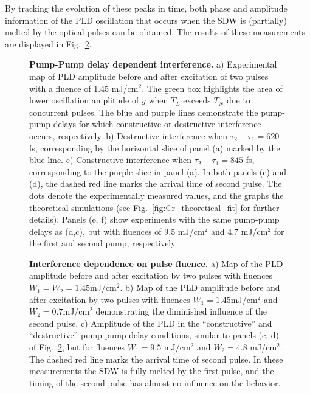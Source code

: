 By tracking the evolution of these peaks in time, both phase and amplitude information of the PLD oscillation that occurs when the SDW is (partially) melted by the optical pulses can be obtained.
The results of these measurements are displayed in Fig.~\ref{fig:Cr_experimental}.
\begin{figure}
	\centering
{}
\caption{\label{fig:Cr_experimental}{\bf Pump-Pump delay dependent interference.} a) Experimental map of PLD amplitude before and after excitation of two pulses with a fluence of 1.45 mJ/cm$^2$. The green box highlights the area of lower oscillation amplitude of $y$ when $T_L$ exceeds $T_N$ due to concurrent pulses. The blue and purple lines demonstrate the pump-pump delays for which constructive or destructive interference occurs, respectively. b) Destructive interference when $\tau_2 - \tau_1 = 620$ fs, corresponding by the horizontal slice of panel (a) marked by the blue line. c) Constructive interference when $\tau_2 - \tau_1 = 845$ fs, corresponding to the purple slice in panel (a). In both panels (c) and (d), the dashed red line marks the arrival time of second pulse. The dots denote the experimentally measured values, and the graphs the theoretical simulations (see Fig.~\ref{fig:Cr_theoretical_fit} for further details). Panels (e, f) show experiments with the same pump-pump delays as (d,c), but with fluences of 9.5 mJ/cm$^2$ and 4.7 mJ/cm$^2$ for the first and second pump, respectively.}
\end{figure}
\begin{figure}
	\centering
{}
\caption{\label{fig:Cr_experimental}{\bf Interference dependence on pulse fluence.} a) Map of the PLD amplitude before and after excitation by two pulses with fluences $W_1=W_2=1.45$mJ/cm$^2$. b) Map of the PLD amplitude before and after excitation by two pulses with fluences $W_1=1.45$mJ/cm$^2$ and $W_2=0.7$mJ/cm$^2$ demonstrating the diminished influence of the second pulse. c) Amplitude of the PLD in the ``constructive'' and ``destructive'' pump-pump delay conditions, similar to panels (c, d) of Fig.~\ref{fig:Cr_experimental}, but for fluences $W_1 = 9.5$ mJ/cm$^2$ and $W_2 = 4.8$ mJ/cm$^2$. The dashed red line marks the arrival time of second pulse. In these measurements the SDW is fully melted by the first pulse, and the timing of the second pulse has almost no influence on the behavior.}
\end{figure}
\\\\
